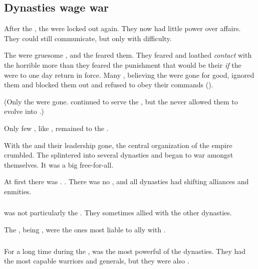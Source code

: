 \subsection{Dynasties wage war}
After the , the \banelords{} were locked out again. 
They now had little power over \Miithian{} affairs. 
They could still communicate, but only with difficulty. 

The \banelords{} were gruesome , and the \resphain{} feared them. 
They feared and loathed \emph{contact} with the horrible \banes{} more than they feared the punishment that would be their \emph{if} the \banes{} were to one day return in force. 
Many \resphain, believing the \banelords{} were gone for good, ignored them and blocked them out and refused to obey their commands (). 

(Only the \banelords{} were gone. 
\Lesserbanes{} continued to serve the \resphain, but the \resphain{} never allowed them to evolve into \banelords.) 

Only few \resphain, like , remained  to the \banelords. 


With the \banes{} and their leadership gone, the central organization of the \resphan{} empire crumbled.
The \resphain{} splintered into several dynasties and began to war amongst themselves. 
It was a big free-for-all. 

At first there was . 
. 
There was no , and all dynasties had shifting alliances and enmities. 





\subsubsection{\Kezerad}
\Kezerad{} was not particularly the . 
They sometimes allied with the other dynasties. 

The \TiphredSerah{}, being , were the ones most liable to ally with \Kezerad. 





\subsubsection{\Mystraacht}
For a long time during the \resphanwars, \Mystraacht{} was the most powerful of the dynasties. 
They had the most capable warriors and generals, but they were also . 

